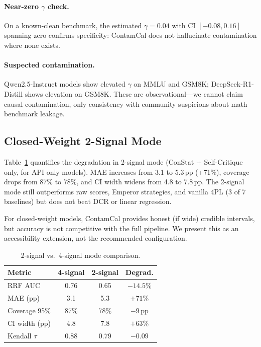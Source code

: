 \documentclass[letterpaper]{article}
\begin{document}
\paragraph{Near-zero $\gamma$ check.}
On a known-clean benchmark, the estimated $\gamma{=}0.04$ with CI $[-0.08, 0.16]$ spanning zero confirms specificity: ContamCal does not hallucinate contamination where none exists.

\paragraph{Suspected contamination.}
Qwen2.5-Instruct models show elevated $\gamma$ on MMLU and GSM8K; DeepSeek-R1-Distill shows elevation on GSM8K.
These are observational---we cannot claim causal contamination, only consistency with community suspicions about math benchmark leakage.

\subsection{Closed-Weight 2-Signal Mode}
\label{sec:closed_weight}

Table~\ref{tab:closed_weight} quantifies the degradation in 2-signal mode (ConStat + Self-Critique only, for API-only models).
MAE increases from 3.1 to 5.3\,pp (+71\%), coverage drops from 87\% to 78\%, and CI width widens from 4.8 to 7.8\,pp.
The 2-signal mode still outperforms raw scores, Emperor strategies, and vanilla 4PL (3 of 7 baselines) but does not beat DCR or linear regression.

For closed-weight models, ContamCal provides honest (if wide) credible intervals, but accuracy is not competitive with the full pipeline.
We present this as an accessibility extension, not the recommended configuration.

\begin{table}[t]
\centering
\caption{2-signal vs.\ 4-signal mode comparison.}
\label{tab:closed_weight}
\begin{tabular}{lccc}
\toprule
\textbf{Metric} & \textbf{4-signal} & \textbf{2-signal} & \textbf{Degrad.} \\
\midrule
RRF AUC & 0.76 & 0.65 & $-14.5\%$ \\
MAE (pp) & 3.1 & 5.3 & $+71\%$ \\
Coverage 95\% & 87\% & 78\% & $-9$\,pp \\
CI width (pp) & 4.8 & 7.8 & $+63\%$ \\
Kendall $\tau$ & 0.88 & 0.79 & $-0.09$ \\
\bottomrule
\end{tabular}
\end{table}
\end{document}
